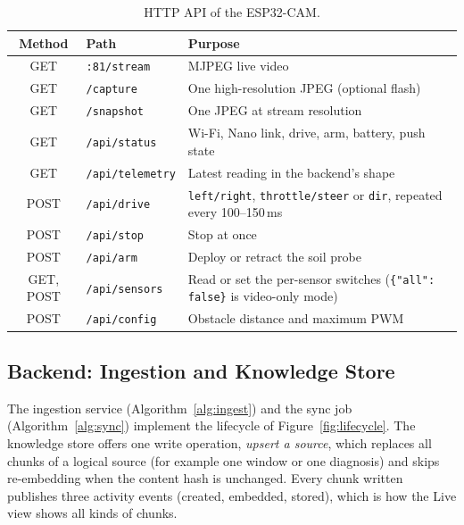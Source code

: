 \begin{table}[H]
\centering
\caption{HTTP API of the ESP32-CAM.}
\label{tab:esp32api}
\small
\begin{tabular}{|c|P{3.5cm}|P{7.6cm}|}
\hline
\textbf{Method} & \textbf{Path} & \textbf{Purpose}\\\hline
GET & \texttt{:81/stream} & MJPEG live video\\\hline
GET & \texttt{/capture} & One high-resolution JPEG (optional flash)\\\hline
GET & \texttt{/snapshot} & One JPEG at stream resolution\\\hline
GET & \texttt{/api/status} & Wi-Fi, Nano link, drive, arm, battery, push state\\\hline
GET & \texttt{/api/telemetry} & Latest reading in the backend's shape\\\hline
POST & \texttt{/api/drive} & \texttt{left/right}, \texttt{throttle/steer} or \texttt{dir}, repeated every 100--150\,ms\\\hline
POST & \texttt{/api/stop} & Stop at once\\\hline
POST & \texttt{/api/arm} & Deploy or retract the soil probe\\\hline
GET, POST & \texttt{/api/sensors} & Read or set the per-sensor switches (\texttt{\{"all": false\}} is video-only mode)\\\hline
POST & \texttt{/api/config} & Obstacle distance and maximum PWM\\\hline
\end{tabular}
\end{table}

\subsection{Backend: Ingestion and Knowledge Store}

The ingestion service (Algorithm~\ref{alg:ingest}) and the sync job (Algorithm~\ref{alg:sync}) implement the lifecycle of
Figure~\ref{fig:lifecycle}. The knowledge store offers one write operation, \emph{upsert a source}, which replaces all chunks of a logical
source (for example one window or one diagnosis) and skips re-embedding when the content hash is unchanged. Every chunk written
publishes three activity events (created, embedded, stored), which is how the Live view shows all kinds of chunks.

